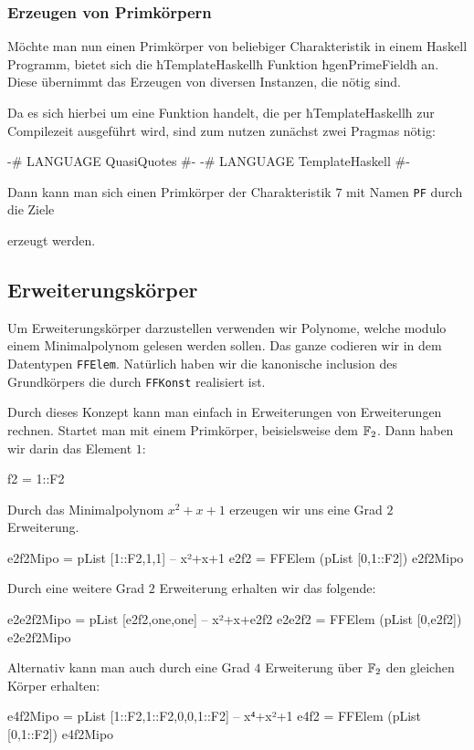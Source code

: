 \subsubsection{Erzeugen von Primkörpern}
Möchte man nun einen Primkörper von beliebiger Charakteristik in einem Haskell
Programm, bietet sich die ħTemplateHaskellħ Funktion ħgenPrimeFieldħ an. Diese
übernimmt das Erzeugen von diversen Instanzen, die nötig sind.

Da es sich hierbei um eine Funktion handelt, die per ħTemplateHaskellħ zur
Compilezeit ausgeführt wird, sind zum nutzen zunächst zwei Pragmas nötig:
\begin{hcode}
{-# LANGUAGE QuasiQuotes #-}
{-# LANGUAGE TemplateHaskell #-}
\end{hcode}
Dann kann man sich einen Primkörper der Charakteristik $7$ mit Namen
\texttt{PF} durch die Ziele
erzeugt werden.

\subsection{Erweiterungskörper}
Um Erweiterungskörper darzustellen verwenden wir Polynome, welche modulo einem
Minimalpolynom gelesen werden sollen. Das ganze codieren wir in dem Datentypen
\texttt{FFElem}.
Natürlich haben wir die kanonische inclusion des Grundkörpers die durch
\texttt{FFKonst} realisiert ist.

Durch dieses Konzept kann man einfach in Erweiterungen von Erweiterungen
rechnen.
Startet man mit einem Primkörper, beisielsweise dem $\mathbb{F}_2$. Dann haben wir
darin das Element $1$:
\begin{hcode}
f2 = 1::F2
\end{hcode}
Durch das Minimalpolynom $x^2+x+1$ erzeugen wir uns eine Grad $2$ Erweiterung.
\begin{hcode}
e2f2Mipo = pList [1::F2,1,1] -- x²+x+1
e2f2 = FFElem (pList [0,1::F2]) e2f2Mipo
\end{hcode}
Durch eine weitere Grad $2$ Erweiterung erhalten wir das folgende:
\begin{hcode}
e2e2f2Mipo = pList [e2f2,one,one] -- x²+x+e2f2
e2e2f2 = FFElem (pList [0,e2f2]) e2e2f2Mipo
\end{hcode}
Alternativ kann man auch durch eine Grad $4$ Erweiterung über $\mathbb{F}_2$ den
gleichen Körper erhalten:
\begin{hcode}
e4f2Mipo = pList [1::F2,1::F2,0,0,1::F2] -- x⁴+x²+1
e4f2 = FFElem (pList [0,1::F2]) e4f2Mipo
\end{hcode}

